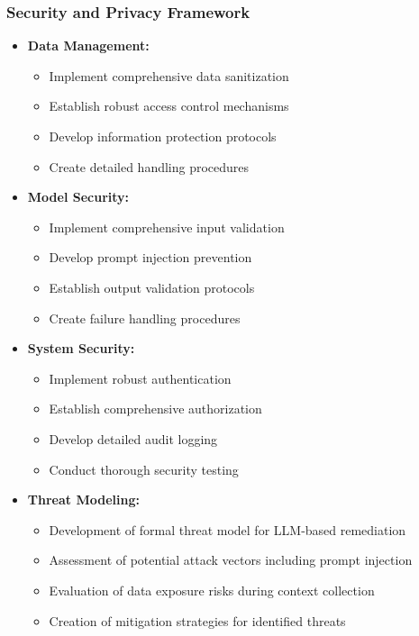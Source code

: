 \subsubsection{Security and Privacy Framework}
\begin{itemize}
    \item \textbf{Data Management:}
        \begin{itemize}
            \item Implement comprehensive data sanitization
            \item Establish robust access control mechanisms
            \item Develop information protection protocols
            \item Create detailed handling procedures
        \end{itemize}
    \item \textbf{Model Security:}
        \begin{itemize}
            \item Implement comprehensive input validation
            \item Develop prompt injection prevention
            \item Establish output validation protocols
            \item Create failure handling procedures
        \end{itemize}
    \item \textbf{System Security:}
        \begin{itemize}
            \item Implement robust authentication
            \item Establish comprehensive authorization
            \item Develop detailed audit logging
            \item Conduct thorough security testing
        \end{itemize}
    \item \textbf{Threat Modeling:}
        \begin{itemize}
            \item Development of formal threat model for LLM-based remediation
            \item Assessment of potential attack vectors including prompt injection
            \item Evaluation of data exposure risks during context collection
            \item Creation of mitigation strategies for identified threats
        \end{itemize}
\end{itemize}

